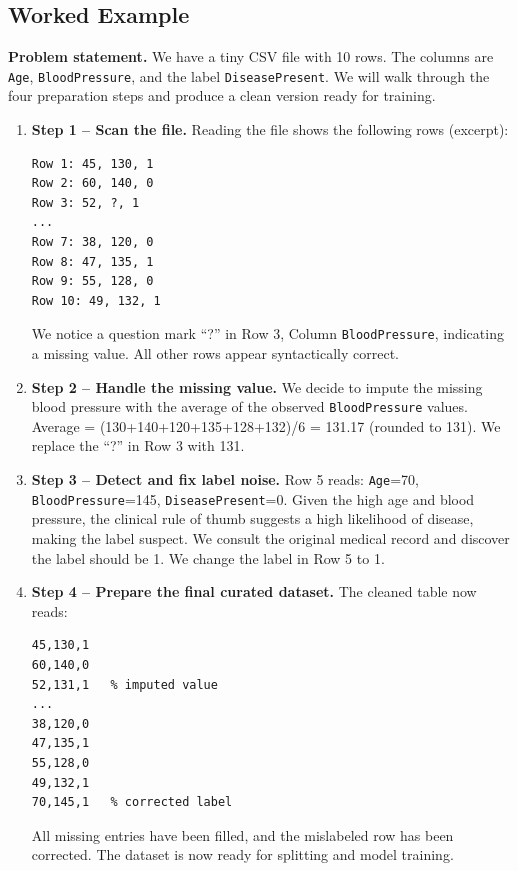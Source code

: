 \documentclass[12pt, a4paper]{article}
\begin{document}
\subsection{Worked Example}
\textbf{Problem statement.}  
We have a tiny CSV file with 10 rows. The columns are \texttt{Age}, \texttt{BloodPressure}, and the label \texttt{DiseasePresent}. We will walk through the four preparation steps and produce a clean version ready for training.

\begin{enumerate}
\item \textbf{Step 1 -- Scan the file.}  
Reading the file shows the following rows (excerpt):

\begin{verbatim}
Row 1: 45, 130, 1
Row 2: 60, 140, 0
Row 3: 52, ?, 1
...
Row 7: 38, 120, 0
Row 8: 47, 135, 1
Row 9: 55, 128, 0
Row 10: 49, 132, 1
\end{verbatim}
We notice a question mark ``?'' in Row 3, Column \texttt{BloodPressure}, indicating a missing value. All other rows appear syntactically correct.

\item \textbf{Step 2 -- Handle the missing value.}  
We decide to impute the missing blood pressure with the average of the observed \texttt{BloodPressure} values.  
Average = (130+140+120+135+128+132)/6 = 131.17 (rounded to 131).  
We replace the ``?'' in Row 3 with 131.

\item \textbf{Step 3 -- Detect and fix label noise.}  
Row 5 reads: \texttt{Age}=70, \texttt{BloodPressure}=145, \texttt{DiseasePresent}=0.  
Given the high age and blood pressure, the clinical rule of thumb suggests a high likelihood of disease, making the label suspect.  
We consult the original medical record and discover the label should be 1.  
We change the label in Row 5 to 1.

\item \textbf{Step 4 -- Prepare the final curated dataset.}  
The cleaned table now reads:

\begin{verbatim}
45,130,1
60,140,0
52,131,1   % imputed value
...
38,120,0
47,135,1
55,128,0
49,132,1
70,145,1   % corrected label
\end{verbatim}
All missing entries have been filled, and the mislabeled row has been corrected. The dataset is now ready for splitting and model training.

\end{enumerate}
\end{document}
